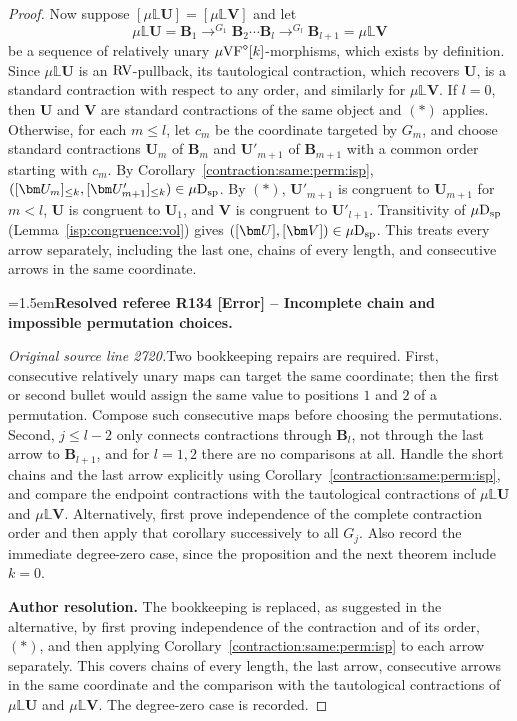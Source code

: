\documentclass[12pt]{amsart}
\newcommand{\ResolvedRefereeRemark}[5]{%
  \par\medskip\begingroup\normalfont\small\color{gray}%
  \emergencystretch=1.5em\noindent\textbf{Resolved referee R#1 [#2] -- #3.}\par\nobreak\noindent #4\par
  \medskip\color{ResolutionGreen}\noindent\textbf{Author resolution.} #5\par
  \endgroup\medskip
}
\theoremstyle{plain}
\theoremstyle{definition}
\theoremstyle{remark}
\numberwithin{equation}{section}
\theoremstyle{plain}
\newcommand{\VF}{\textup{VF}}
\newcommand{\RV}{\textup{RV}}
\newcommand{\0}{\emptyset}
\newcommand{\bb}[1]{\mathbb{#1}}
\newcommand{\mVF}{{\mu}{\VF}}
\newcommand{\dsp}{\textup{D}_{\textup{sp}}}
\newcommand{\mispdb}{\mu \dsp}
\newcommand{\mL}{{\mu}{\bb L}}
\begin{document}
\begin{proof}
Now suppose $[\mL \bm U] = [\mL \bm V]$ and let
\[
\mu\bb L \bm U = \bm B_1 \to^{G_1} \bm B_2 \cdots \bm B_l \to^{G_l} \bm B_{l+1} = \mu\bb L \bm V
\]
be a sequence of relatively unary $\mVF^\diamond[k]$-morphisms, which exists by definition. Since $\mL \bm U$ is an $\RV$-pullback, its tautological contraction, which recovers $\bm U$, is a standard contraction with respect to any order, and similarly for $\mL \bm V$. If $l = 0$, then $\bm U$ and $\bm V$ are standard contractions of the same object and $(\ast)$ applies. Otherwise, for each $m \leq l$, let $c_m$ be the coordinate targeted by $G_m$, and choose standard contractions $\bm U_m$ of $\bm B_m$ and $\bm U'_{m+1}$ of $\bm B_{m+1}$ with a common order starting with $c_m$. By Corollary~\ref{contraction:same:perm:isp}, $([\bm U_m]_{\leq k}, [\bm U'_{m+1}]_{\leq k}) \in \mispdb$. By $(\ast)$, $\bm U'_{m+1}$ is congruent to $\bm U_{m+1}$ for $m < l$, $\bm U$ is congruent to $\bm U_1$, and $\bm V$ is congruent to $\bm U'_{l+1}$. Transitivity of $\mispdb$ (Lemma~\ref{isp:congruence:vol}) gives $([\bm U], [\bm V]) \in \mispdb$. This treats every arrow separately, including the last one, chains of every length, and consecutive arrows in the same coordinate.

\ResolvedRefereeRemark{134}{Error}{Incomplete chain and impossible permutation choices}{%
\textit{Original source line 2720.}\quad Two bookkeeping repairs are required. First, consecutive relatively unary maps can target the same coordinate; then the first or second bullet would assign the same value to positions $1$ and $2$ of a permutation. Compose such consecutive maps before choosing the permutations. Second, $j\leq l-2$ only connects contractions through $\bm B_l$, not through the last arrow to $\bm B_{l+1}$, and for $l=1,2$ there are no comparisons at all. Handle the short chains and the last arrow explicitly using Corollary~\ref{contraction:same:perm:isp}, and compare the endpoint contractions with the tautological contractions of $\mL\bm U$ and $\mL\bm V$. Alternatively, first prove independence of the complete contraction order and then apply that corollary successively to all $G_j$. Also record the immediate degree-zero case, since the proposition and the next theorem include $k=0$.
}{The bookkeeping is replaced, as suggested in the alternative, by first proving independence of the contraction and of its order, $(\ast)$, and then applying Corollary~\ref{contraction:same:perm:isp} to each arrow separately. This covers chains of every length, the last arrow, consecutive arrows in the same coordinate and the comparison with the tautological contractions of $\mL\bm U$ and $\mL\bm V$. The degree-zero case is recorded.}



\end{proof}
\end{document}

